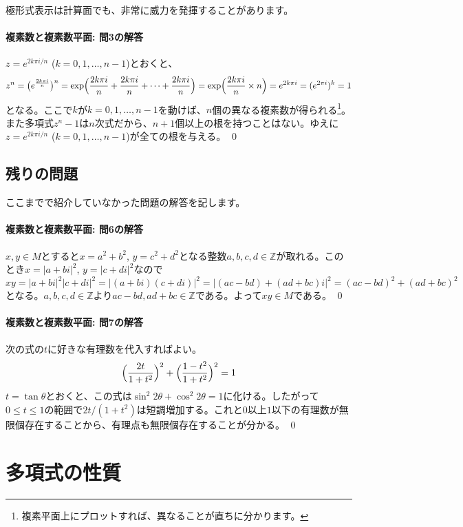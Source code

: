 極形式表示は計算面でも、非常に威力を発揮することがあります。


\paragraph{複素数と複素数平面: 問3の解答} $z=e^{2k\pi i/n}$ ($k=0,1,\ldots,n-1$)とおくと、
\[
z^n = \bigl(e^{\frac{2k\pi i}{n}}\bigr)^n = \exp\Bigl(\frac{2k\pi i}{n}+\frac{2k\pi i}{n}+\cdots+\frac{2k\pi i}{n}\Bigr) = \exp \Bigl(\frac{2k\pi i}{n} \times n\Bigr) = e^{2k\pi i} = (e^{2\pi i})^k = 1
\]
となる。ここで$k$が$k=0,1,\ldots,n-1$を動けば、$n$個の異なる複素数が得られる\footnote{複素平面上にプロットすれば、異なることが直ちに分かります。}。また多項式$z^n-1$は$n$次式だから、$n+1$個以上の根を持つことはない。ゆえに$z=e^{2k\pi i/n}$ ($k=0,1,\ldots,n-1$)が全ての根を与える。 \qed

\subsection{残りの問題}

ここまでで紹介していなかった問題の解答を記します。

\paragraph{複素数と複素数平面: 問6の解答} 

$x,y\in M$とすると$x=a^2+b^2$, $y=c^2+d^2$となる整数$a,b,c,d\in\mathbb{Z}$が取れる。このとき$x=|a+bi|^2$, $y=|c+di|^2$なので$xy=|a+bi|^2|c+di|^2=|(a+bi)(c+di)|^2=|(ac-bd)+(ad+bc)i|^2=(ac-bd)^2+(ad+bc)^2$となる。$a,b,c,d\in\mathbb{Z}$より$ac-bd,ad+bc\in\mathbb{Z}$である。よって$xy\in M$である。 \qed

\paragraph{複素数と複素数平面: 問7の解答} 
次の式の$t$に好きな有理数を代入すればよい。
\[
\Bigl(\frac{2t}{1+t^2}\Bigr)^2 + \Bigl(\frac{1-t^2}{1+t^2}\Bigr)^2 = 1
\]
$t=\tan\theta$とおくと、この式は$\sin^2 2\theta+\cos^2 2\theta=1$に化ける。したがって$0\leq t \leq 1$の範囲で$2t/(1+t^2)$は短調増加する。これと$0$以上$1$以下の有理数が無限個存在することから、有理点も無限個存在することが分かる。 \qed 

\section{多項式の性質}

